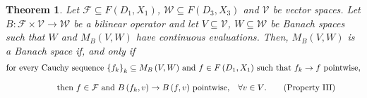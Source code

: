 \documentclass[14pt, a4paper]{article}  %
\providecommand{\llave}[1]{\left\lbrace #1\right\rbrace }
\providecommand{\pare}[1]{\left( #1\right) }
\newcommand{\tien}{\rightarrow}
\newcommand{\F}{\mathcal{F}}
\newcommand{\V}{\mathcal{V}}
\newcommand{\W}{\mathcal{W}}
\newtheorem{theorem}{Theorem}[section]
\begin{document}
\begin{theorem} \label{d265_b_0} \label{d248_0_b}   \label{q15_b} Let  $\F\subseteq F\pare{D_{1}, X_{1}}$, $\W\subseteq F\pare{D_{3},X_{3}}$ and  $\V$ be vector spaces. Let $B:\F\times \V\tien   \W$ be a bilinear operator and let $V\subseteq \V$, $W\subseteq \W$ be Banach spaces such that $W$ and   $M_{B}\pare{V,W}$ have continuous evaluations. Then,  $M_{B}\pare{V,W}$ is a Banach space if, and only if 
		\begin{align} 
	&\text{for every Cauchy sequence $\llave{f_{k}}_{k}\subseteq M_{B}\pare{V,W}$ and $f\in F\pare{D_{1}, X_{1}}$ such that $f_{k}\tien f$ pointwise,} \nonumber \\[.3 cm]
	&\qquad \qquad \qquad \text{then $f\in \F$ and $B\pare{f_{k},v} \tien B\pare{f,v}$ pointwise,\quad $\forall v\in V$}. 
	\tag{Property III} \label{lola85_0}
	\end{align} 
\end{theorem}
\end{document}
